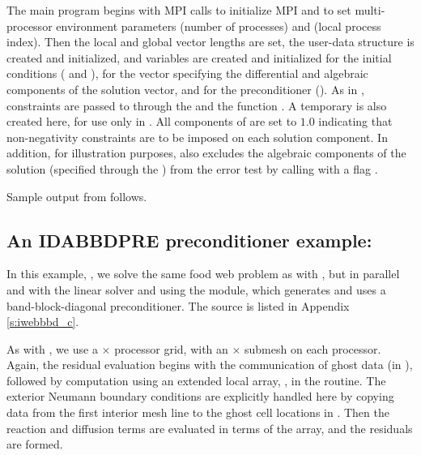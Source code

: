 The  main program begins with MPI calls to initialize MPI and to
set multi-processor environment parameters  (number of processes) and
 (local process index).  Then the local and global vector lengths
are set, the user-data structure  is created and initialized, and
 variables are created and initialized for the initial conditions
( and ), for the vector  specifying the differential 
and algebraic components of the solution vector, and for the preconditioner
().  As in , constraints are passed to {\ida} through the
  and the function .  
A temporary   is also created here, for use only in
.
All components of  are set to $1.0$ indicating that
non-negativity constraints are to be imposed on each solution component.  
In addition, for illustration purposes,  also excludes the
algebraic components of the solution (specified through the 
) from the error test by calling  with a
flag .

Sample output from  follows.


\subsection{An IDABBDPRE preconditioner example: }\label{ss:iwebbbd}

In this example, , we solve the same food web problem as with
, but in parallel and with the {\idaspgmr} linear solver and
using the {\idabbdpre} module, which generates and uses a band-block-diagonal 
preconditioner.  The source is listed in Appendix \ref{s:iwebbbd_c}.

As with , we use a  $\times$  processor grid, with
an  $\times$  submesh on each processor.  Again, the residual
evaluation begins with the communication of ghost data (in ),
followed by computation using an extended local array, , in the
 routine.
The exterior Neumann boundary conditions are explicitly handled here
by copying data from the first interior mesh line to the ghost cell
locations in .  Then the reaction and diffusion terms are
evaluated in terms of the  array, and the residuals are formed.

